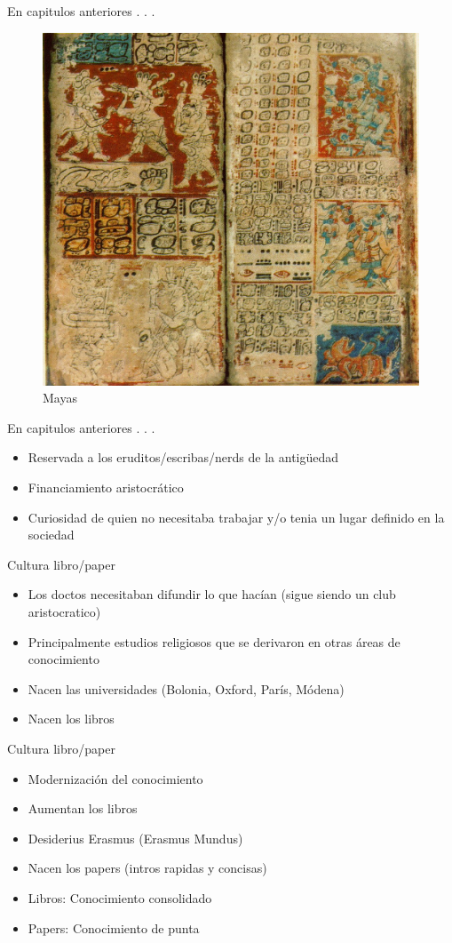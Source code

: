 \documentclass{beamer}
\begin{document}
\begin{frame}{En capitulos anteriores . . .}

\begin{figure}[tbph]
\centering
\includegraphics[width=0.50\linewidth]{./Figures/dresden}
\caption{Mayas}
\label{fig:dresden}
\end{figure}

\end{frame}

\begin{frame}{En capitulos anteriores . . .}
\begin{itemize}
\item Reservada a los eruditos/escribas/nerds de la antigüedad
\item Financiamiento aristocrático
\item Curiosidad de quien no necesitaba trabajar y/o tenia un lugar definido en la sociedad
\end{itemize}
\end{frame}

\begin{frame}{Cultura libro/paper}
\begin{itemize}
\item Los doctos necesitaban difundir lo que hacían (sigue siendo un club aristocratico)
\item Principalmente estudios religiosos que se derivaron en otras áreas de conocimiento
\item Nacen las universidades (Bolonia, Oxford, París, Módena)
\item Nacen los libros
\end{itemize}
\end{frame}

\begin{frame}{Cultura libro/paper}
\begin{itemize}
\item Modernización del conocimiento
\item Aumentan los libros
\item Desiderius Erasmus (Erasmus Mundus)
\item Nacen los papers (intros rapidas y concisas)
\item Libros: Conocimiento consolidado
\item Papers: Conocimiento de punta
\end{itemize}
\end{frame}
\end{document}
